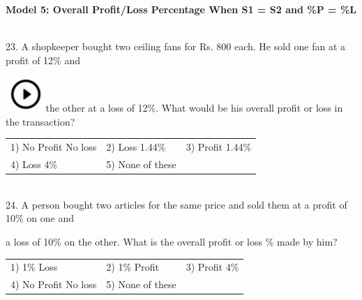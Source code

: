 \documentclass{article}
\begin{document}
	\noindent 
	
	\noindent 
	
	\noindent 
	
	\noindent 
	
	\noindent 
	
	\noindent \textbf{Model 5: Overall Profit/Loss Percentage When S1 = S2 and \%P = \%L}
	
	\noindent 
	
	\noindent 
	
	\noindent \\  23.  A shopkeeper bought two ceiling fans for Rs. 800 each. He sold one fan at a profit of 12\% and
	
	\noindent \includegraphics*[width=0.60in, height=0.52in]{images/image1}the other at a loss of 12\%. What would be his overall profit or loss in the transaction?
	
	\noindent 
	\begin{tabular}{p{1.7in} p{1.6in} p{1.6in}} \\ 
 1) No Profit No loss                                    & 2) Loss 1.44\%                            & 3) Profit 1.44\%
	
	\noindent 
	
	\noindent \\
4) Loss 4\%                                                     & 5) None of these \\
\end{tabular}
	
	\noindent 
	
	\noindent 
	
	\noindent 
	\newpage
	\noindent \\  24. A person bought two articles for the same price and sold them at a profit of 10\% on one and
	
	\noindent 
	
	\noindent a loss of 10\% on the other. What is the overall profit or loss \% made by him?
	
	\noindent 
	
	\begin{tabular}{p{1.9in} p{1.5in} p{0.9in}|}  

 1) 1\% Loss & 2) 1\% Profit & 3) Profit 4\% \\  
		
4) No Profit No loss & 5) None of these &  \\  
	\end{tabular}
	
\end{document}
